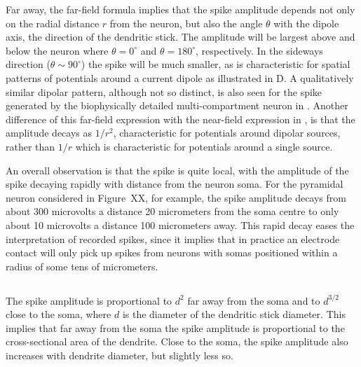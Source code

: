 Far away, the far-field formula  implies that the spike amplitude depends not only on the radial distance $r$ from the neuron, but also the angle $\theta$ with the dipole axis, the direction of the dendritic stick. The amplitude will be largest above and below the neuron where $\theta=0^\circ$ and $\theta=180^\circ$, respectively. In the sideways direction 
($\theta \sim 90^\circ$) the spike will be much smaller, as is characteristic for spatial patterns of potentials around a current
dipole as illustrated in D. A qualitatively similar dipolar pattern, although not so distinct,
is also seen for the spike generated by the biophysically detailed multi-compartment neuron in 
.
Another difference of this far-field expression with the near-field expression in , is that the
amplitude decays as $1/r^2$, characteristic for potentials around dipolar sources, rather than $1/r$ which is characteristic for potentials around 
a single source. %

An overall observation is that the spike is quite local, with the amplitude of the spike decaying rapidly with distance from the neuron soma. 
For the pyramidal neuron considered in Figure~XX, for example, the spike amplitude decays from about
300 microvolts a distance 20 micrometers from the soma centre to only about 10 microvolts a
distance 100 micrometers away. 
This rapid decay eases the interpretation of recorded spikes, since it implies
that in practice an electrode contact will only pick up spikes from neurons with somas positioned within a radius of some tens of micrometers.

\subsection{}
The spike amplitude is proportional to $d^{2}$ far away from the soma and to $d^{3/2}$ close to the soma,
where $d$ is the diameter of the dendritic stick diameter. This implies that far away from the soma the spike amplitude is proportional to  the cross-sectional area of the dendrite. Close to the soma, the spike amplitude also increases with dendrite diameter, but slightly less so.

